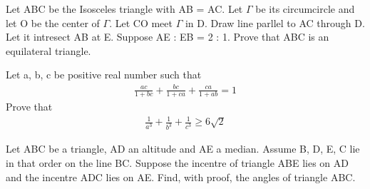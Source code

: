 \item Let ABC be the Isosceles triangle with AB = AC. Let $\Gamma$ be its circumcircle and let O be the center of $\Gamma$. Let CO meet $\Gamma$ in D. Draw line parllel to AC through D. Let it intresect AB at E. Suppose AE : EB = 2 : 1. Prove that ABC is an equilateral triangle.

\item Let a, b, c be positive real number such that
\begin{align*}
\frac{ac}{1+bc} + \frac{bc}{1+ca} + \frac{ca}{1+ab} = 1
\end{align*}
Prove that 
\begin{align*}
\frac{1}{a^3} + \frac{1}{b^3} + \frac{1}{c^3} \geq 6\sqrt{2}
\end{align*}

\item Let ABC be a triangle, AD an altitude and AE a median. Assume B, D, E, C lie in that order on the line BC. Suppose the incentre of triangle ABE lies on AD and the incentre ADC lies on AE. Find, with proof, the angles of triangle ABC.

